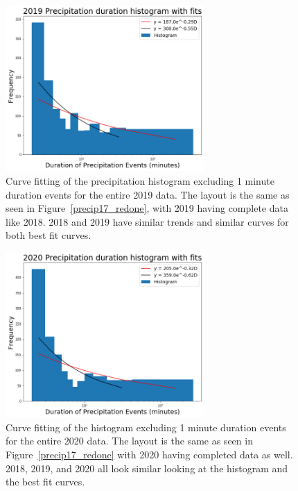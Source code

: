 \documentclass[11pt]{report}
\begin{document}
\begin{figure}[t]
\centering
\includegraphics[width=0.675\textwidth]{Figures/precip19_new.png}
\caption[2019 precipitation duration exponentials with contrasting curve
  fitting] {\label{precip19_redone}Curve fitting of the precipitation
  histogram excluding 1 minute duration events for the entire 2019 data. The
  layout is the same as seen in Figure~\ref{precip17_redone}, with 2019
  having complete data like 2018. 2018 and 2019 have similar trends and
  similar curves for both best fit curves.}
\end{figure}

\begin{figure}[b]
\centering
\includegraphics[width=0.675\textwidth]{Figures/precip20_new.png}
\caption[2020 precipitation duration exponentials with contrasting curve
  fitting] {\label{precip20_redone}Curve fitting of the histogram excluding
  1 minute duration events for the entire 2020 data. The layout is the same
  as seen in Figure~\ref{precip17_redone} with 2020 having completed data as
  well. 2018, 2019, and 2020 all look similar looking at the histogram and
  the best fit curves.}
\end{figure}
\end{document}
